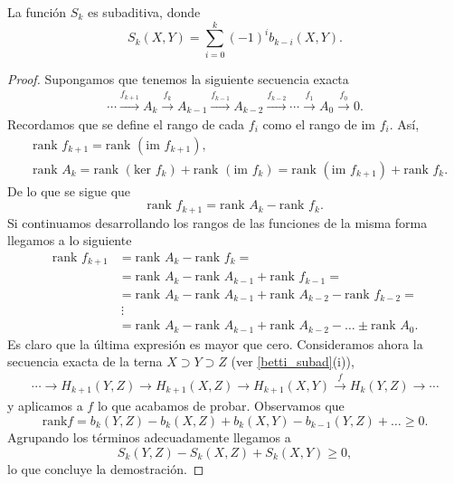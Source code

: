 \begin{lemma}
\label{lema_desig_morse}
    La función $S_{k}$ es subaditiva, donde 
    \begin{equation*}
        S_{k}(X,Y) = \sum_{i=0}^{k} (-1)^i b_{k-i}(X,Y).
    \end{equation*}
\end{lemma}
\begin{proof}
    Supongamos que tenemos la siguiente secuencia exacta
    \begin{align*}
        \cdots \overset{f_{k+1}}{\longrightarrow} A_k \overset{f_{k}}{\longrightarrow} A_{k-1} \overset{f_{k-1}}{\longrightarrow} A_{k-2} \overset{f_{k-2}}{\longrightarrow} \cdots \overset{f_{1}}{\longrightarrow} A_0 \overset{f_{0}}{\longrightarrow} 0.
    \end{align*}
    Recordamos que se define el rango de cada $f_i$ como el rango de $\text{im } f_i$. Así,
    \begin{align*}
        &\text{rank } f_{k+1} = \text{rank } (\text{im }f_{k+1}),\\
        &\text{rank }A_k = \text{rank } (\text{ker }f_{k}) + \text{rank } (\text{im }f_{k}) = \text{rank } (\text{im }f_{k+1}) + \text{rank } f_{k}. 
    \end{align*}
    De lo que se sigue que
    \begin{equation*}
        \text{rank } f_{k+1}  = \text{rank }A_k - \text{rank } f_{k}.
    \end{equation*}
    Si continuamos desarrollando los rangos de las funciones de la misma forma llegamos a lo siguiente
    \begin{align*}
        \text{rank } f_{k+1}  &= \text{rank }A_k - \text{rank } f_{k}=\\
        &= \text{rank }A_k - \text{rank }A_{k-1} + \text{rank } f_{k-1} =\\
        &= \text{rank }A_k - \text{rank }A_{k-1} + \text{rank }A_{k-2} - \text{rank } f_{k-2} =\\
        &~\vdots\\
        &= \text{rank }A_k - \text{rank }A_{k-1} + \text{rank }A_{k-2} - \dots \pm \text{rank }A_0.
    \end{align*}
    Es claro que la última expresión es mayor que cero. Consideramos ahora la secuencia exacta de la terna $X\supset Y\supset Z$ (ver \ref{betti_subad}(i)),
    \begin{align*}
        \cdots \longrightarrow H_{k+1}(Y,Z) \longrightarrow H_{k+1}(X,Z) \longrightarrow H_{k+1}(X,Y) \overset{f}{\longrightarrow} H_{k}(Y,Z) \longrightarrow \cdots
    \end{align*}
    y aplicamos a $f$ lo que acabamos de probar. Observamos que
    \begin{equation*}
        \text{rank} f = b_k(Y,Z) - b_k(X,Z) + b_k(X,Y) - b_{k-1}(Y,Z) + \dots \ge 0.
    \end{equation*}
    Agrupando los términos adecuadamente llegamos a
    \begin{equation}
    \label{demo_charac}
        S_{k}(Y,Z) - S_{k}(X,Z) + S_{k}(X,Y) \ge 0,
    \end{equation}
    lo que concluye la demostración.

\end{proof}


